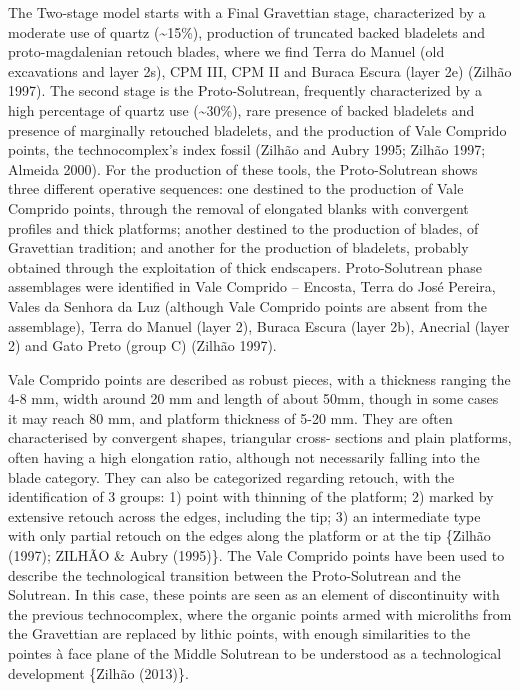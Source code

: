 \documentclass[12pt,twoside]{reedthesis}
\begin{document}
The Two-stage model starts with a Final Gravettian stage, characterized by a moderate use of quartz (\textasciitilde15\%), production of truncated backed bladelets and proto-magdalenian retouch blades, where we find Terra do Manuel (old excavations and layer 2s), CPM III, CPM II and Buraca Escura (layer 2e) (Zilhão 1997). The second stage is the Proto-Solutrean, frequently characterized by a high percentage of quartz use (\textasciitilde30\%), rare presence of backed bladelets and presence of marginally retouched bladelets, and the production of Vale Comprido points, the technocomplex's index fossil (Zilhão and Aubry 1995; Zilhão 1997; Almeida 2000). For the production of these tools, the Proto-Solutrean shows three different operative sequences: one destined to the production of Vale Comprido points, through the removal of elongated blanks with convergent profiles and thick platforms; another destined to the production of blades, of Gravettian tradition; and another for the production of bladelets, probably obtained through the exploitation of thick endscapers. Proto-Solutrean phase assemblages were identified in Vale Comprido -- Encosta, Terra do José Pereira, Vales da Senhora da Luz (although Vale Comprido points are absent from the assemblage), Terra do Manuel (layer 2), Buraca Escura (layer 2b), Anecrial (layer 2) and Gato Preto (group C) (Zilhão 1997).

Vale Comprido points are described as robust pieces, with a thickness ranging the 4-8 mm, width around 20 mm and length of about 50mm, though in some cases it may reach 80 mm, and platform thickness of 5-20 mm. They are often characterised by convergent shapes, triangular cross- sections and plain platforms, often having a high elongation ratio, although not necessarily falling into the blade category. They can also be categorized regarding retouch, with the identification of 3 groups: 1) point with thinning of the platform; 2) marked by extensive retouch across the edges, including the tip; 3) an intermediate type with only partial retouch on the edges along the platform or at the tip \{Zilhão (1997); ZILHÃO \& Aubry (1995)\}. The Vale Comprido points have been used to describe the technological transition between the Proto-Solutrean and the Solutrean. In this case, these points are seen as an element of discontinuity with the previous technocomplex, where the organic points armed with microliths from the Gravettian are replaced by lithic points, with enough similarities to the pointes à face plane of the Middle Solutrean to be understood as a technological development \{Zilhão (2013)\}.
\end{document}

